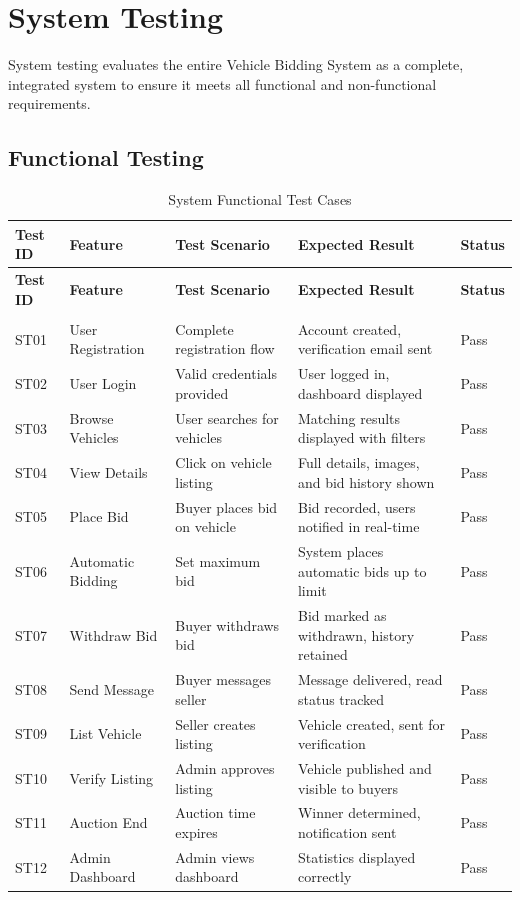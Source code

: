 \section{System Testing}

System testing evaluates the entire Vehicle Bidding System as a complete, integrated system to ensure it meets all functional and non-functional requirements.

\subsection{Functional Testing}

\begin{longtable}{|p{1.8cm}|p{2.8cm}|p{3.2cm}|p{3cm}|p{1cm}|}
    \hline
    \textbf{Test ID} & \textbf{Feature} & \textbf{Test Scenario} & \textbf{Expected Result} & \textbf{Status} \\
    \hline
    \endfirsthead

    \hline
    \textbf{Test ID} & \textbf{Feature} & \textbf{Test Scenario} & \textbf{Expected Result} & \textbf{Status} \\
    \hline
    \endhead

    \hline
    \endfoot

    \hline
    \caption{System Functional Test Cases} \label{tab:system_tests} \\
    \endlastfoot

    ST01 & User Registration & Complete registration flow & Account created, verification email sent & Pass \\
    \hline
    ST02 & User Login & Valid credentials provided & User logged in, dashboard displayed & Pass \\
    \hline
    ST03 & Browse Vehicles & User searches for vehicles & Matching results displayed with filters & Pass \\
    \hline
    ST04 & View Details & Click on vehicle listing & Full details, images, and bid history shown & Pass \\
    \hline
    ST05 & Place Bid & Buyer places bid on vehicle & Bid recorded, users notified in real-time & Pass \\
    \hline
    ST06 & Automatic Bidding & Set maximum bid & System places automatic bids up to limit & Pass \\
    \hline
    ST07 & Withdraw Bid & Buyer withdraws bid & Bid marked as withdrawn, history retained & Pass \\
    \hline
    ST08 & Send Message & Buyer messages seller & Message delivered, read status tracked & Pass \\
    \hline
    ST09 & List Vehicle & Seller creates listing & Vehicle created, sent for verification & Pass \\
    \hline
    ST10 & Verify Listing & Admin approves listing & Vehicle published and visible to buyers & Pass \\
    \hline
    ST11 & Auction End & Auction time expires & Winner determined, notification sent & Pass \\
    \hline
    ST12 & Admin Dashboard & Admin views dashboard & Statistics displayed correctly & Pass \\
\end{longtable}

